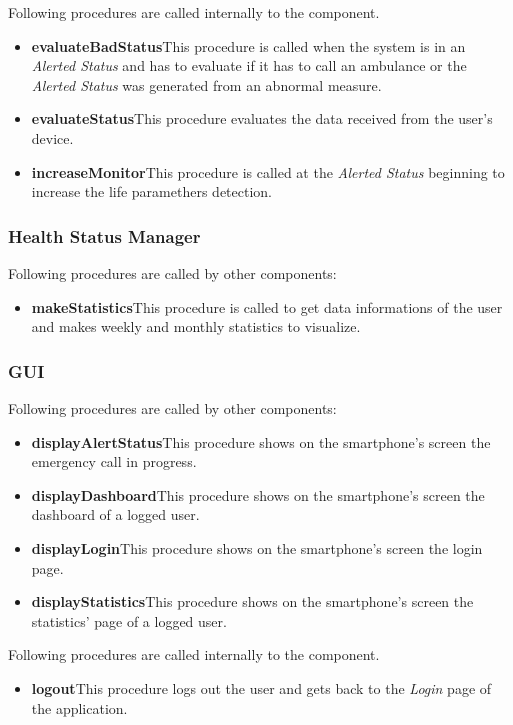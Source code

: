 \myparagraph{}
Following procedures are called internally to the component.
\begin{itemize}
  \item \textbf{evaluateBadStatus}\quad This procedure is called when the system is in an \textit{Alerted Status} and has to evaluate if it has to call an ambulance or the \textit{Alerted Status} was generated from an abnormal measure.
  \item \textbf{evaluateStatus}\quad This procedure evaluates the data received from the user's device.

  \item \textbf{increaseMonitor}\quad This procedure is called at the \textit{Alerted Status} beginning to increase the life paramethers detection.
\end{itemize}

\subsubsection{Health Status Manager}
Following procedures are called by other components:
\begin{itemize}
  \item \textbf{makeStatistics}\quad This procedure is called to get data informations of the user and makes weekly and monthly statistics to visualize.
\end{itemize}

\subsubsection{GUI}
Following procedures are called by other components:
\begin{itemize}
  \item \textbf{displayAlertStatus}\quad This procedure shows on the smartphone's screen the emergency call in progress.
  \item \textbf{displayDashboard}\quad This procedure shows on the smartphone's screen the dashboard of a logged user.
  \item \textbf{displayLogin}\quad This procedure shows on the smartphone's screen the login page.
  \item \textbf{displayStatistics}\quad This procedure shows on the smartphone's screen the statistics' page of a logged user.
\end{itemize}

\myparagraph{}
Following procedures are called internally to the component.
\begin{itemize}
  \item \textbf{logout}\quad This procedure logs out the user and gets back to the \textit{Login} page of the application.
\end{itemize}

